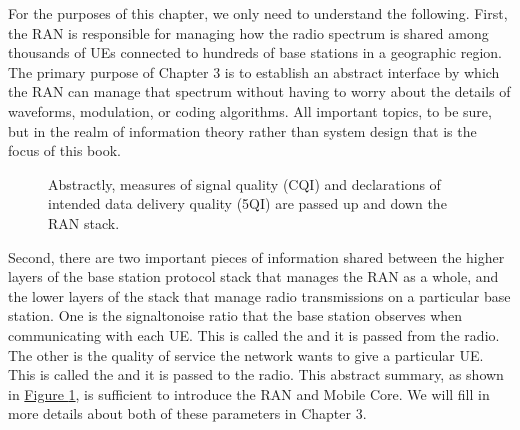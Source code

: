 \documentclass[a4paper,11pt,english]{sphinxmanual}
\let\sphinxpxdimen\pdfpxdimen\else\newdimen\sphinxpxdimen
\begin{document}
\sphinxAtStartPar
For the purposes of this chapter, we only need to understand the
following. First, the RAN is responsible for managing how the radio
spectrum is shared among thousands of UEs connected to hundreds of
base stations in a geographic region. The primary purpose of Chapter 3
is to establish an abstract interface by which the RAN can manage that
spectrum without having to worry about the details of waveforms,
modulation, or coding algorithms. All important topics, to be sure,
but in the realm of information theory rather than system design that
is the focus of this book.

\begin{figure}[ht]
\centering
\capstart

\noindent\sphinxincludegraphics[width=300\sphinxpxdimen]{{Slide5}.png}
\caption{Abstractly, measures of signal quality (CQI) and declarations
of intended data delivery quality (5QI) are passed up and down
the RAN stack.}\label{\detokenize{arch:id6}}\label{\detokenize{arch:fig-quality}}\end{figure}

\sphinxAtStartPar
Second, there are two important pieces of information shared between
the higher layers of the base station protocol stack that manages the
RAN as a whole, and the lower layers of the stack that manage radio
transmissions on a particular base station. One is the signal\sphinxhyphen{}to\sphinxhyphen{}noise
ratio that the base station observes when communicating with each
UE. This is called the  and it is
passed  from the radio. The other is the quality of service the
network wants to give a particular UE. This is called the  and it is passed  to the radio. This abstract
summary, as shown in \hyperref[\detokenize{arch:fig-quality}]{Figure \ref{\detokenize{arch:fig-quality}}}, is sufficient
to introduce the RAN and Mobile Core. We will fill in more details
about both of these parameters in Chapter 3.
\end{document}
